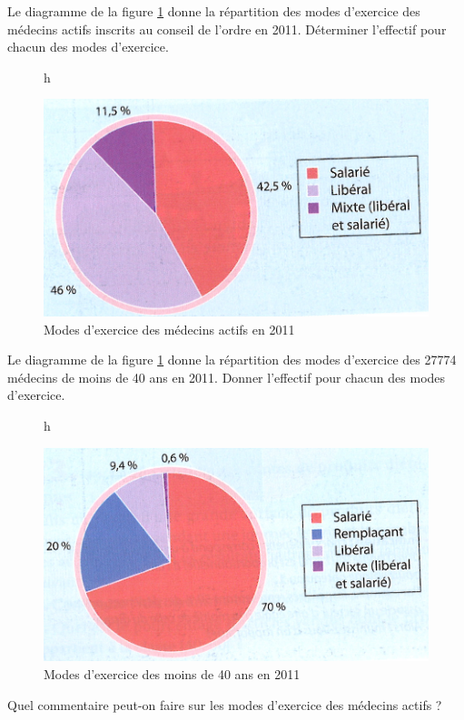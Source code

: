 \begin{questions}
	
	\question Le diagramme de la figure \ref{fig:mode_exercice1} donne la répartition des modes d'exercice des médecins actifs inscrits au conseil de l'ordre en 2011. Déterminer l'effectif pour chacun des modes d'exercice.
	
	\begin{figure}{h}
		\begin{center}
			\includegraphics[scale=0.4]{mode_exercice1}
			\caption{Modes d'exercice des médecins actifs en 2011}
			\label{fig:mode_exercice1}
		\end{center}
	\end{figure}
	
	\question Le diagramme de la figure \ref{fig:mode_exercice1} donne la répartition des modes d'exercice des \num{27774} médecins de moins de 40 ans en 2011. Donner l'effectif pour chacun des modes d'exercice.
	
	\begin{figure}{h}
		\begin{center}
			\includegraphics[scale=0.4]{mode_exercice2}
			\caption{Modes d'exercice des moins de 40 ans en 2011}
			\label{fig:mode_exercice2}
		\end{center}
	\end{figure}
	
	
	\question Quel commentaire peut-on faire sur les modes d'exercice des médecins actifs ?
\end{questions}